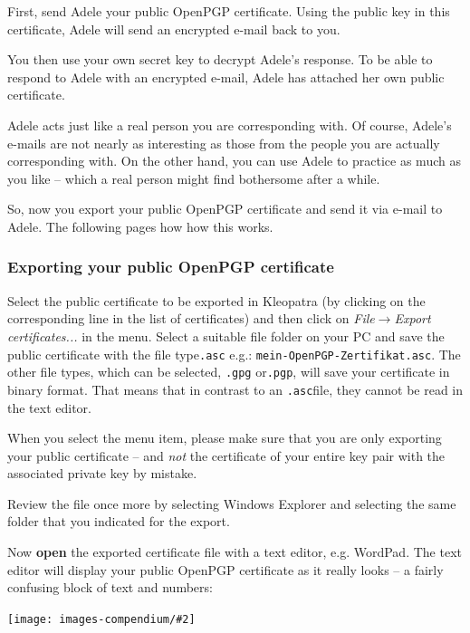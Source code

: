 \documentclass[a4paper,11pt,oneside,openright,titlepage]{scrbook}
\newcommand{\Menu}[1]{\textit{#1}}
\newcommand{\Filename}[1]{\small{\texttt{#1}}\normalsize}
\newcommand{\Email}{e-mail}
\newcommand{\IncludeImage}[2][]{
\begin{center}
  \texttt{[image: images-compendium/\#2]}%
\end{center}
}
\begin{document}
First, send Adele your public OpenPGP certificate. Using the public
key in this certificate, Adele will send an encrypted \Email{}
back to you.

You then use your own secret key to decrypt Adele's response. To be
able to respond to Adele with an encrypted \Email{}, Adele has
attached her own public certificate.

Adele acts just like a real person you are corresponding with. Of
course, Adele's \Email{}s are not nearly as interesting as those from
the people you are actually corresponding with. On the other hand, you
can use Adele to practice as much as you like -- which a real person
might find bothersome after a while.

So, now you export your public OpenPGP certificate and send it via
\Email{} to Adele. The following pages how how this works.


\clearpage
\subsubsection{Exporting your public OpenPGP certificate}

Select the public certificate to be exported in Kleopatra (by clicking
on the corresponding line in the list of certificates) and then click
on \Menu{File$\rightarrow$Export certificates...} in the menu.
Select a suitable file folder on your PC and save the public
certificate with the file type\Filename{.asc} e.g.:
\Filename{mein-OpenPGP-Zertifikat.asc}. The other file types, which
can be selected, \Filename{.gpg} or\Filename{.pgp}, will save your
certificate in binary format. That means that in contrast to an
\Filename{.asc}file, they cannot be read in the text editor.

When you select the menu item, please make sure that you are only
exporting your public certificate -- and \textit{not } the certificate
of your entire key pair with the associated private key by mistake.

Review the file once more by selecting Windows Explorer and selecting
the same folder that you indicated for the export.

Now \textbf{open} the exported certificate file with a text
editor, e.g. WordPad. The text editor will display your public OpenPGP
certificate as it really looks -- a fairly confusing block of text and
numbers:
\enlargethispage{\baselineskip}

\IncludeImage[width=0.85\textwidth]{sc-wordpad-editOpenpgpKey_en}
\end{document}
